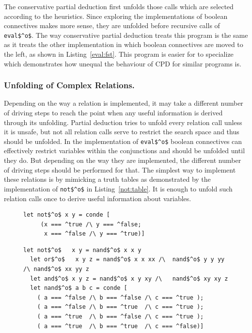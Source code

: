 The conservative partial deduction first unfolds those calls which are selected according to the heuristics.
Since exploring the implementations of boolean connectives makes more sense, they are unfolded before recursive calls of \lstinline{eval$^o$}.
The way conservative partial deduction treats this program is the same as it treats the other implementation in which boolean connectives
are moved to the left, as shown in Listing~\ref{eval:fst}.
This program is easier for \ecce to specialize which demonstrates how unequal the behaviour of CPD for similar programs is.

\subsubsection{Unfolding of Complex Relations.}

Depending on the way a relation is implemented, it may take a different number of driving steps to reach the point when any useful information is derived through its unfolding.
Partial deduction tries to unfold every relation call unless it is unsafe, but not all relation calls serve to restrict the search space and thus should be unfolded.
In the implementation of \lstinline{eval$^o$} boolean connectives can effectively restrict variables within the conjunctions and should be unfolded until they do.
But depending on the way they are implemented, the different number of driving steps should be performed for that.
The simplest way to implement these relations is by mimicking a truth tables as demonstrated by the implementation of \lstinline{not$^o$} in Listing~\ref{not:table}.
It is enough to unfold such relation calls once to derive useful information about variables.

\begin{figure}[!t]
  \centering
  \begin{minipage}{0.5\textwidth}
    \begin{lstlisting}[label={not:table}, caption={Implementation of boolean \lstinline{not} as a table}, captionpos=b, frame=tb]
  let not$^o$ x y = conde [
     (x === ^true /\ y === ^false;
      x === ^false /\ y === ^true)]
    \end{lstlisting}
  \end{minipage}
  \begin{minipage}{0.8\textwidth}
    \begin{lstlisting}[label={not:nando}, caption={Implementation of boolean operation via \lstinline{nand}}, captionpos=b, frame=tb]
  let not$^o$   x y = nand$^o$ x x y
  let or$^o$   x y z = nand$^o$ x x xx /\  nand$^o$ y y yy /\ nand$^o$ xx yy z
  let and$^o$ x y z = nand$^o$ x y xy /\   nand$^o$ xy xy z
  let nand$^o$ a b c = conde [
    ( a === ^false /\ b === ^false /\ c === ^true );
    ( a === ^false /\ b === ^true  /\ c === ^true );
    ( a === ^true  /\ b === ^false /\ c === ^true );
    ( a === ^true  /\ b === ^true  /\ c === ^false)]
    \end{lstlisting}
  \end{minipage}
\end{figure}

